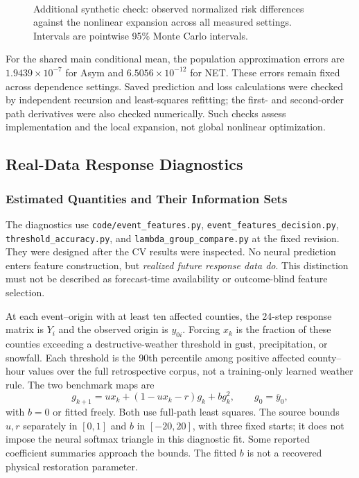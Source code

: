 \begin{figure}[!htbp]
\centering
{}\\[-1pt]
\caption{Additional synthetic check: observed normalized risk differences against the nonlinear expansion across all measured settings. Intervals are pointwise 95\% Monte Carlo intervals.}
\label{fig:calibration}
\end{figure}

For the shared main conditional mean, the population approximation errors are $1.9439\times10^{-7}$ for Asym and $6.5056\times10^{-12}$ for NET. These errors remain fixed across dependence settings. Saved prediction and loss calculations were checked by independent recursion and least-squares refitting; the first- and second-order path derivatives were also checked numerically. Such checks assess implementation and the local expansion, not global nonlinear optimization.

\subsection{Real-Data Response Diagnostics}
\label{app:empirical_diagnostics}
\subsubsection{Estimated Quantities and Their Information Sets}
The diagnostics use \texttt{code/event\_features.py}, \texttt{event\_features\_decision.py}, \texttt{threshold\_accuracy.py}, and \texttt{lambda\_group\_compare.py} at the fixed revision. They were designed after the CV results were inspected. No neural prediction enters feature construction, but \emph{realized future response data do}. This distinction must not be described as forecast-time availability or outcome-blind feature selection.

At each event--origin with at least ten affected counties, the 24-step response matrix is $Y_i$ and the observed origin is $y_{0i}$. Forcing $x_k$ is the fraction of these counties exceeding a destructive-weather threshold in gust, precipitation, or snowfall. Each threshold is the 90th percentile among positive affected county--hour values over the full retrospective corpus, not a training-only learned weather rule. The two benchmark maps are
\[
 g_{k+1}=ux_k+(1-ux_k-r)g_k+b g_k^2,\qquad
 g_0=\overline y_0,
\]
with $b=0$ or fitted freely. Both use full-path least squares. The source bounds $u,r$ separately in $[0,1]$ and $b$ in $[-20,20]$, with three fixed starts; it does not impose the neural softmax triangle in this diagnostic fit. Some reported coefficient summaries approach the bounds. The fitted $b$ is not a recovered physical restoration parameter.

